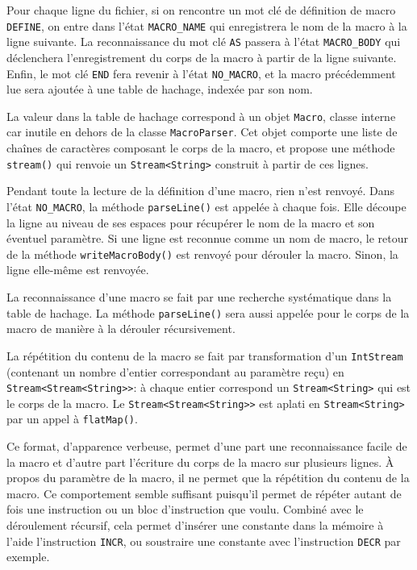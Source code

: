 \documentclass[titlepage]{article}
\begin{document}
        Pour chaque ligne du fichier, si on rencontre un mot clé de définition de macro \texttt{DEFINE}, on entre dans l'état \texttt{MACRO\_NAME} qui enregistrera le nom de la macro à la ligne suivante.
        La reconnaissance du mot clé \texttt{AS} passera à l'état \texttt{MACRO\_BODY} qui déclenchera l'enregistrement du corps de la macro à partir de la ligne suivante.
        Enfin, le mot clé \texttt{END} fera revenir à l'état \texttt{NO\_MACRO}, et la macro précédemment lue sera ajoutée à une table de hachage, indexée par son nom.
        
        La valeur dans la table de hachage correspond à un objet \texttt{Macro}, classe interne car inutile en dehors de la classe \texttt{MacroParser}.
        Cet objet comporte une liste de chaînes de caractères composant le corps de la macro, et propose une méthode \texttt{stream()} qui renvoie un \texttt{Stream<String>} construit à partir de ces lignes.

        Pendant toute la lecture de la définition d'une macro, rien n'est renvoyé.
        Dans l'état \texttt{NO\_MACRO}, la méthode \texttt{parseLine()} est appelée à chaque fois. Elle découpe la ligne au niveau de ses espaces pour récupérer le nom de la macro et son éventuel paramètre. Si une ligne est reconnue comme un nom de macro, le retour de la méthode \texttt{writeMacroBody()} est renvoyé pour dérouler la macro.
        Sinon, la ligne elle-même est renvoyée.
        
    La reconnaissance d'une macro se fait par une recherche systématique dans la table de hachage. La méthode \texttt{parseLine()} sera aussi appelée pour le corps de la macro de manière à la dérouler récursivement.

    La répétition du contenu de la macro se fait par transformation d'un \texttt{IntStream} (contenant un nombre d'entier correspondant au paramètre reçu) en \texttt{Stream<Stream<String>>}: à chaque entier correspond un \texttt{Stream<String>} qui est le corps de la macro. Le \texttt{Stream<Stream<String>>} est aplati en \texttt{Stream<String>} par un appel à \texttt{flatMap()}.

        Ce format, d'apparence verbeuse, permet d'une part une reconnaissance facile de la macro et d'autre part l'écriture du corps de la macro sur plusieurs lignes.
        À propos du paramètre de la macro, il ne permet que la répétition du contenu de la macro. Ce comportement semble suffisant puisqu'il permet de répéter autant de fois une instruction ou un bloc d'instruction que voulu. Combiné avec le déroulement récursif, cela permet d'insérer une constante dans la mémoire à l'aide l'instruction \texttt{INCR}, ou soustraire une constante avec l'instruction \texttt{DECR} par exemple.
\end{document}
